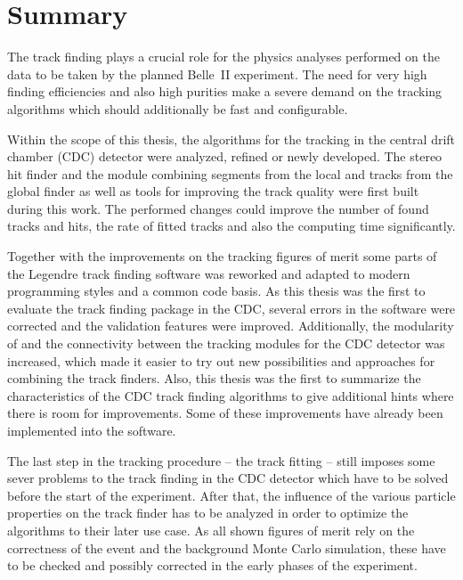 \chapter*{Summary}

The track finding plays a crucial role for the physics analyses performed on the data to be taken by the planned Belle~II experiment. The need for very high finding efficiencies and also high purities make a severe demand on the tracking algorithms which should additionally be fast and configurable.

Within the scope of this thesis, the algorithms for the tracking in the central drift chamber (CDC) detector were analyzed, refined or newly developed. The stereo hit finder and the module combining segments from the local and tracks from the global finder as well as tools for improving the track quality were first built during this work. The performed changes could improve the number of found tracks and hits, the rate of fitted tracks and also the computing time significantly.

Together with the improvements on the tracking figures of merit some parts of the Legendre track finding software was reworked and adapted to modern programming styles and a common code basis. As this thesis was the first to evaluate the track finding package in the CDC, several errors in the software were corrected and the validation features were improved. Additionally, the modularity of and the connectivity between the tracking modules for the CDC detector was increased, which made it easier to try out new possibilities and approaches for combining the track finders. Also, this thesis was the first to summarize the characteristics of the CDC track finding algorithms to give additional hints where there is room for improvements. Some of these improvements have already been implemented into the software.

The last step in the tracking procedure -- the track fitting -- still imposes some sever problems to the track finding in the CDC detector which have to be solved before the start of the experiment. After that, the influence of the various particle properties on the track finder has to be analyzed in order to optimize the algorithms to their later use case. As all shown figures of merit rely on the correctness of the event and the background Monte Carlo simulation, these have to be checked and possibly corrected in the early phases of the experiment.

